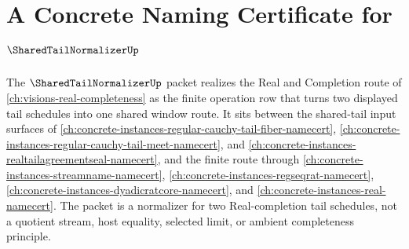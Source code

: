 \chapter{A Concrete Naming Certificate for $\SharedTailNormalizerUp$}
\label{ch:concrete-instances-sharedtailnormalizer-namecert}

The $\SharedTailNormalizerUp$ packet realizes the Real and Completion route of \autoref{ch:visions-real-completeness} as the finite operation row that turns two displayed tail schedules into one shared window route. It sits between the shared-tail input surfaces of \autoref{ch:concrete-instances-regular-cauchy-tail-fiber-namecert}, \autoref{ch:concrete-instances-regular-cauchy-tail-meet-namecert}, and \autoref{ch:concrete-instances-realtailagreementseal-namecert}, and the finite route through \autoref{ch:concrete-instances-streamname-namecert}, \autoref{ch:concrete-instances-regseqrat-namecert}, \autoref{ch:concrete-instances-dyadicratcore-namecert}, and \autoref{ch:concrete-instances-real-namecert}. The packet is a normalizer for two Real-completion tail schedules, not a quotient stream, host equality, selected limit, or ambient completeness principle.



